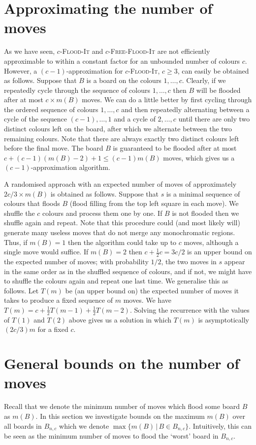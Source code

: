 \documentclass[a4paper,11pt]{llncs}
\newcounter{l}
\renewcommand{\geq}{\geqslant}
\renewcommand{\leq}{\leqslant}
\newcommand{\Coloroid}[1]{$#1$-\textsc{Flood-It}}
\newcommand{\ColoroidFree}[1]{$#1$-\textsc{Free-Flood-It}}
\newcommand{\Mnc}{\ensuremath{\max\{m(B)\,|\,B \in B_{n,c}\}}}
\begin{document}
\section{Approximating the number of moves} \label{sec:approx}
As we have seen, \Coloroid{c} and \ColoroidFree{c} are not efficiently approximable to within a constant factor for an unbounded number of colours $c$. However, a $(c-1)$-approximation for \Coloroid{c}, $c \geq 3$, can easily be obtained as follows. Suppose that $B$ is a board on the colours $1,\dots,c$. Clearly, if we repeatedly cycle through the sequence of colours $1,\dots,c$  then $B$ will be flooded after at most $c\times m(B)$ moves. We can do a little better by first cycling through the ordered sequence of colours $1,\dots,c$ and then repeatedly alternating between a cycle of the sequence $(c-1),\dots,1$ and a cycle of $2,\dots,c$ until there are only two distinct colours left on the board, after which we alternate between the two remaining colours. Note that there are always exactly two distinct colours left before the final move. The board $B$ is guaranteed to be flooded after at most $c+(c-1)(m(B)-2)+1\leq (c-1)m(B)$ moves, which gives us a $(c-1)$-approximation algorithm.

A randomised approach with an expected number of moves of approximately $2c/3\times m(B)$ is obtained as follows. Suppose that $s$ is a minimal sequence of colours that floods $B$ (flood filling from the top left square in each move). We shuffle the $c$ colours and process them one by one. If $B$ is not flooded then we shuffle again and repeat. Note that this procedure could (and most likely will) generate many useless moves that do not merge any monochromatic regions. Thus, if $m(B)=1$ then the algorithm could take up to $c$ moves, although a single move would suffice. If $m(B)=2$ then $c + \frac{1}{2} c=3c/2$ is an upper bound on the expected number of moves; with probability $1/2$, the two moves in $s$ appear in the same order as in the shuffled sequence of colours, and if not, we might have to shuffle the colours again and repeat one last time. We generalise this as follows. Let $T(m)$ be (an upper bound on) the expected number of moves it takes to produce a fixed sequence of $m$ moves. We have $T(m)=c+\frac{1}{2}T(m-1)+\frac{1}{2}T(m-2)$. Solving the recurrence with the values of $T(1)$ and $T(2)$ above gives us a solution in which $T(m)$ is asymptotically $(2c/3)m$ for a fixed $c$.



\section{General bounds on the number of moves} \label{sec:bound}
Recall that we denote the minimum number of moves which flood some board $B$ as $m(B)$. In this section we investigate bounds on the maximum $m(B)$ over all boards in $B_{n,c}$ which we denote \Mnc{}. Intuitively, this can be seen as the minimum number of moves to flood the `worst' board in $B_{n,c}$.
\end{document}
